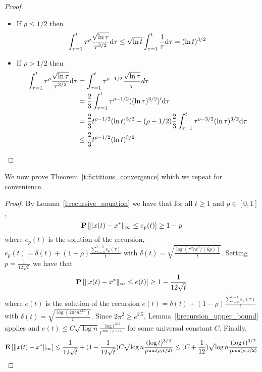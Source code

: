 \begin{proof}
  \begin{itemize}
    \item If
      $\rho\leq 1/2$ then
      \[
        \int_{\tau=1}^t \tau^\rho\frac{\sqrt{\ln \tau}}{\tau^{3/2}}\mathrm{d}\tau
        \leq
        \sqrt{\ln t }
        \int_{\tau=1}^t
        \frac{1}{\tau}\mathrm{d}\tau = (\ln t)^{3/2}
      \]
    \item If $\rho > 1/2$ then\\
      \begin{align*}
        \int_{\tau=1}^t
        \tau^\rho\frac{\sqrt{\ln \tau}}{\tau^{3/2}}\mathrm{d}\tau
        &=
        \int_{\tau=1}^t \tau^{\rho-1/2}\frac{\sqrt{\ln \tau}}{\tau}d\tau \\
        &=
        \frac{2}{3} \int_{\tau=1}^t
        \tau^{\rho-1/2}((\ln \tau)^{3/2})'\mathrm{d}\tau \\
        &=
        \frac{2}{3}t^{\rho - 1/2}(\ln t)^{3/2} - (\rho-1/2)\frac{2}{3}
        \int_{\tau=1}^t \tau^{\rho-3/2}(\ln \tau)^{3/2}\mathrm{d}\tau \\
        &\leq \frac{2}{3} t^{\rho - 1/2}(\ln t)^{3/2}
      \end{align*}
  \end{itemize}
\end{proof}
%
We now prove Theorem~\ref{t:fictitious_convergence} which we repeat for convenience.

\begin{proof}
By Lemma~\ref{l:recursive_equation} we have that for all $t\geq 1$ and $p \in [0,1]$,
\[\bm{\mathrm{P}}\left[\| x(t)-x^* \|_{\infty} \leq e_p(t)\right] \geq 1-p\]
where $e_p(t)$ is the solution of the recursion, $e_p(t) =\delta(t) + (1-\rho)\frac{\sum_{\tau=0}^{t-1}e_p(\tau)}{t}$ with
$\delta(t)=\sqrt{ \frac{\log(\pi^2 n t^2/(6 p))}{t}}$. Setting $p=\frac{1}{12\sqrt{t}}$ we have that
\[\bm{\mathrm{P}}\left[\| x(t)-x^* \|_{\infty} \leq e(t)\right] \geq 1-\frac{1}{12\sqrt{t}}\]
where $e(t)$ is the solution of the recursion $e(t) =\delta(t) + (1-\rho)\frac{\sum_{\tau=0}^{t-1}e_p(\tau)}{t}$ with
$\delta(t)=\sqrt{\frac{\log(2\pi^2 n t^{2.5})}{t}}$. Since $2\pi^2 \geq e^{2.5}$, Lemma~\ref{l:recursion_upper_bound} applies and
$e(t)\leq C\sqrt{\log n}\frac{\log t^{3/2}}{t^{\min(\rho,1/2)}}$ for some universal constant $C$. Finally,
\[\bm{\mathrm{E}}_{} \left[ \| x(t) - x^* \|_{\infty} \right] \leq \frac{1}{12\sqrt{t}} + (1-\frac{1}{12\sqrt{t}})C\sqrt{\log n}\frac{(\log t)^{3/2}}{t^{\min(\rho,1/2)}}
\leq (C+\frac{1}{12})\sqrt{\log n}\frac{(\log t)^{3/2}}{t^{\min(\rho,1/2)}}\]
\end{proof}
